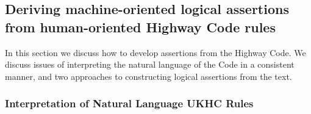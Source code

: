 
\subsection{Deriving machine-oriented logical assertions from human-oriented Highway Code rules}
In this section we discuss how to develop assertions from the Highway Code. We discuss issues of interpreting the natural language of the Code in a consistent manner, and two approaches to constructing logical assertions from the text. 

\subsubsection{Interpretation of Natural Language UKHC Rules} \label{interp_nat_lang_UKHC_rules}

